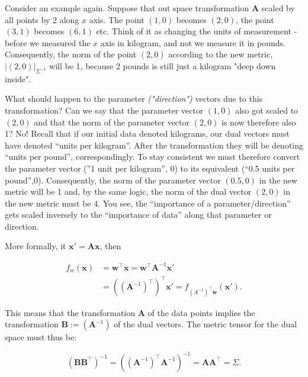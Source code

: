 \documentclass{article}
\begin{document}
Consider an example again. Suppose that out space transformation $\bm{A}$ scaled by all points by 2 along $x$ axis. The point $(1,0)$ becomes $(2,0)$, the point $(3,1)$ becomes $(6,1)$ etc. Think of it as changing the units of measurement - before we measured the $x$ axis in kilogram, and not we measure it in pounds. Consequently, the norm of the point $(2,0)$ according to the new metric, $|(2,0)|_{\Sigma^{-1}}$ will be 1, because 2 pounds is still just a kilogram "deep down inside". \medskip

What should happen to the parameter \textit{("direction")} vectors due to this transformation? Can we say that the parameter vector $(1,0)$ also got scaled to $(2,0)$ and that the norm of the parameter vector $(2,0)$ is now therefore also 1? No! Recall that if our initial data denoted kilograms, our dual vectors must have denoted “units per kilogram”. After the transformation they will be denoting “units per pound”, correspondingly. To stay consistent we must therefore convert the parameter vector (”1 unit per kilogram”, 0) to its equivalent (“0.5 units per pound”,0). Consequently, the norm of the parameter vector $(0.5,0)$ in the new metric will be 1 and, by the same logic, the norm of the dual vector $(2,0)$ in the new metric must be 4. You see, the “importance of a parameter/direction” gets scaled inversely to the “importance of data” along that parameter or direction.\medskip

More formally, it $\bm{x}' = \bm{A}\bm{x}$, then

\begin{equation}
  \begin{aligned}
    f_{w}(\bm{x}) &= \bm{w}^{\intercal}\bm{x} = \bm{w}^{\intercal}\bm{A}^{-1}\bm{x}' \\
    &= \left(\left(\bm{A}^{-1}\right)^{\intercal}\right)^{\intercal}\bm{x}' = f_{(A^{-1})^{\intercal}\bm{w}}(\bm{x}').
  \end{aligned}
\end{equation}

This means that the transformation $\bm{A}$ of the data points implies the transformation $\bm{B}:=\left(\bm{A}^{-1}\right)$ of the dual vectors. The metric tensor for the dual space must thus be:

\begin{equation}
\left(\bm{B}\bm{B}^{\intercal}\right)^{-1} = \left(\left(\bm{A}^{-1}\right)^{\intercal}\bm{A}^{-1}\right)^{-1} = \bm{A}\bm{A}^{\intercal} = \Sigma.
\end{equation}
\end{document}
